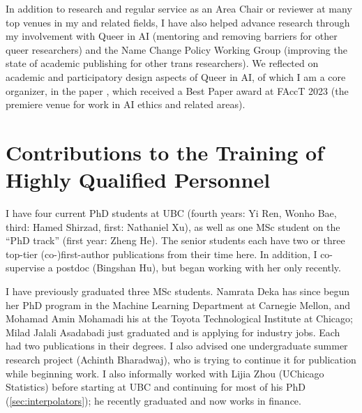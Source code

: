 \documentclass[12pt]{article}
\begin{document}
In addition to research and regular service as an Area Chair or reviewer at many top venues in my and related fields,
I have also helped advance research through my involvement with
Queer in AI (mentoring and removing barriers for other queer researchers)
and the Name Change Policy Working Group (improving the state of academic publishing for other trans researchers).
We reflected on academic and participatory design aspects of Queer in AI, of which I am a core organizer,
in the paper \cite{queerinai:qai},
which received a Best Paper award at FAccT 2023 (the premiere venue for work in AI ethics and related areas).

\clearpage
\section{Contributions to the Training of Highly Qualified Personnel}

I have four current PhD students at UBC
(fourth years: Yi Ren, Wonho Bae, third: Hamed Shirzad, first: Nathaniel Xu),
as well as one MSc student on the ``PhD track'' (first year: Zheng He).
The senior students each have two or three top-tier (co-)first-author publications from their time here.
In addition, I co-supervise a postdoc (Bingshan Hu), but began working with her only recently.

I have previously graduated three MSc students.
Namrata Deka has since begun her PhD program in the Machine Learning Department at Carnegie Mellon,
and Mohamad Amin Mohamadi his at the Toyota Technological Institute at Chicago;
Milad Jalali Asadabadi just graduated and is applying for industry jobs.
Each had two publications in their degrees.
I also advised one undergraduate summer research project (Achinth Bharadwaj),
who is trying to continue it for publication while beginning work.
I also informally worked with Lijia Zhou (UChicago Statistics) before starting at UBC and continuing for most of his PhD (\cref{sec:interpolators}); he recently graduated and now works in finance.
\end{document}
